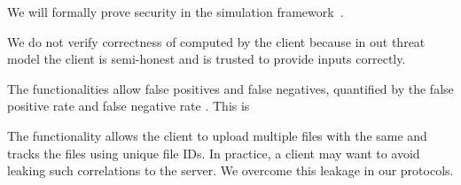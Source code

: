 \enumListEnd




%
We will formally prove security in the simulation framework~\cite{lindell2017simulate}. 




\enumListStart



\item We do not verify correctness of \contentToken{\clientData} computed by the client because in out threat model 
the client is semi-honest and is trusted to provide inputs correctly. 

\item The functionalities allow false positives and false negatives, quantified by the false positive rate \fpr and false negative rate \fnr. This is 


\item The functionality allows the client to upload multiple files with the same \contentToken{\clientData} and tracks the files using unique file IDs. In practice, a client may want to avoid leaking such correlations to the server. We overcome this leakage in our protocols.



